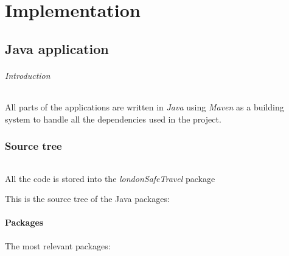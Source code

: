 \part{Implementation}

\chapter{Java application}

\paragraph{Introduction}
All parts of the applications are written in \textit{Java} using \textit{Maven} 
as a building system to handle all the dependencies used in the project.

\section{Source tree}

\paragraph{}
All the code is stored into the \textit{londonSafeTravel} package

This is the source tree of the Java packages:

%

\subsection{Packages}
The most relevant packages:

